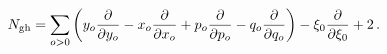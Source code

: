 \begin{equation}
N_{\mathrm{gh}}=\sum_{o>0}\left( y_{o}{\frac{\partial }{\partial y_{o}}}%
-x_{o}{\frac{\partial }{\partial x_{o}}}+p_{o}{\frac{\partial }{\partial
p_{o}}}-q_{o}{\frac{\partial }{\partial q_{o}}}\right) -\xi _{0}{\frac{%
\partial }{\partial \xi _{0}}}+2\,.
\end{equation}

